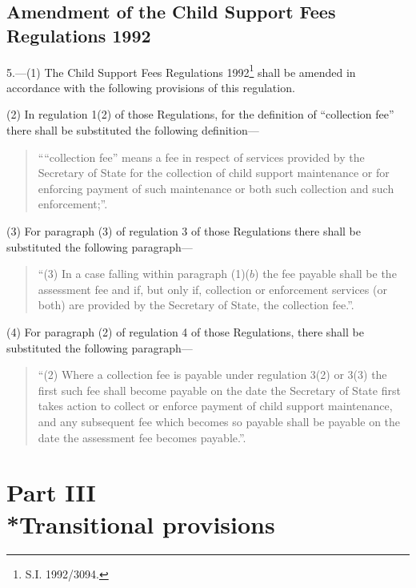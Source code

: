 \documentclass[12pt,a4paper]{article}
\begin{document}
\subsection[5. Amendment of the Child Support Fees Regulations 1992]{Amendment of the Child Support Fees Regulations 1992}

5.—(1) The Child Support Fees Regulations 1992\footnote{\frenchspacing S.I. 1992/3094.} shall be amended in accordance with the following provisions of this regulation.

(2) In regulation 1(2) of those Regulations, for the definition of “collection fee” there shall be substituted the following definition—
\begin{quotation}
““collection fee” means a fee in respect of services provided by the Secretary of State for the collection of child support maintenance or for enforcing payment of such maintenance or both such collection and such enforcement;”.
\end{quotation}

(3) For paragraph (3) of regulation 3 of those Regulations there shall be substituted the following paragraph—
\begin{quotation}
“(3) In a case falling within paragraph (1)($b$) the fee payable shall be the assessment fee and if, but only if, collection or enforcement services (or both) are provided by the Secretary of State, the collection fee.”.
\end{quotation}

(4) For paragraph (2) of regulation 4 of those Regulations, there shall be substituted the following paragraph—
\begin{quotation}
“(2) Where a collection fee is payable under regulation 3(2) or 3(3) the first such fee shall become payable on the date the Secretary of State first takes action to collect or enforce payment of child support maintenance, and any subsequent fee which becomes so payable shall be payable on the date the assessment fee becomes payable.”.
\end{quotation}

\section[Part III --- Transitional provisions]{Part III\\*Transitional provisions}

\renewcommand\parthead{--- Part III}
\end{document}
